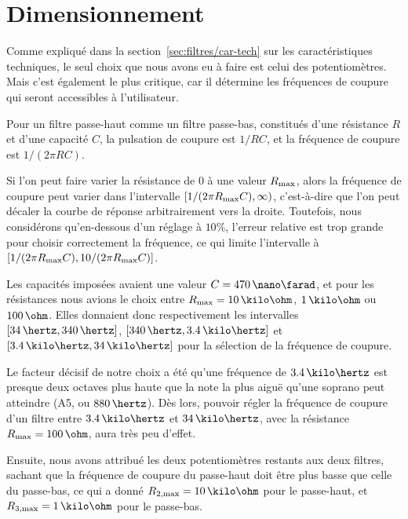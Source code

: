 \section{Dimensionnement}

Comme expliqué dans la section~\ref{sec:filtres/car-tech}
sur les caractéristiques techniques,
le seul choix que nous avons eu à faire est celui des potentiomètres.
Mais c'est également le plus critique, car
il détermine les fréquences de coupure qui seront accessibles à l'utilisateur.

Pour un filtre passe-haut comme un filtre passe-bas,
constitués d'une résistance $R$ et d'une capacité $C$,
la pulsation de coupure est $1/RC$,
et la fréquence de coupure est $1/(2\pi RC)$.

Si l'on peut faire varier la résistance de $0$ à une valeur $R_{\mathrm{max}}$,
alors la fréquence de coupure peut varier dans l'intervalle
$[1/(2\pi R_{\mathrm{max}}C),\infty)$,
c'est-à-dire que l'on peut décaler la courbe
de réponse arbitrairement vers la droite.
Toutefois, nous considérons qu'en-dessous d'un réglage à $10\%$,
l'erreur relative est trop grande pour choisir correctement la fréquence,
ce qui limite l'intervalle à $[1/(2\pi R_{\mathrm{max}}C),10/(2\pi R_{\mathrm{max}}C)]$.

Les capacités imposées avaient une valeur $C=470\,\nano\farad$,
et pour les résistances nous avions le choix entre
$R\ind{max}=10\,\kilo\ohm$, $1\,\kilo\ohm$ ou $100\,\ohm$.
Elles donnaient donc respectivement les intervalles
$[34\,\hertz,340\,\hertz]$, $[340\,\hertz,3.4\,\kilo\hertz]$
et $[3.4\,\kilo\hertz,34\,\kilo\hertz]$
pour la sélection de la fréquence de coupure.

Le facteur décisif de notre choix a été
qu'une fréquence de $3.4\,\kilo\hertz$ est
presque deux octaves plus haute que la note la plus aiguë
qu'une soprano peut atteindre (A5, ou $880\,\hertz$).%
\cite{vocal-ranges}
Dès lors, pouvoir régler la fréquence de coupure d'un filtre
entre $3.4\,\kilo\hertz$ et $34\,\kilo\hertz$,
avec la résistance $R\ind{max} = 100\,\ohm$, aura très peu d'effet.

Ensuite, nous avons attribué les deux potentiomètres restants
aux deux filtres, sachant que la fréquence de coupure du passe-haut
doit être plus basse que celle du passe-bas,
ce qui a donné $R\ind{2,max}=10\,\kilo\ohm$ pour le passe-haut,
et $R\ind{3,max}=1\,\kilo\ohm$ pour le passe-bas.

